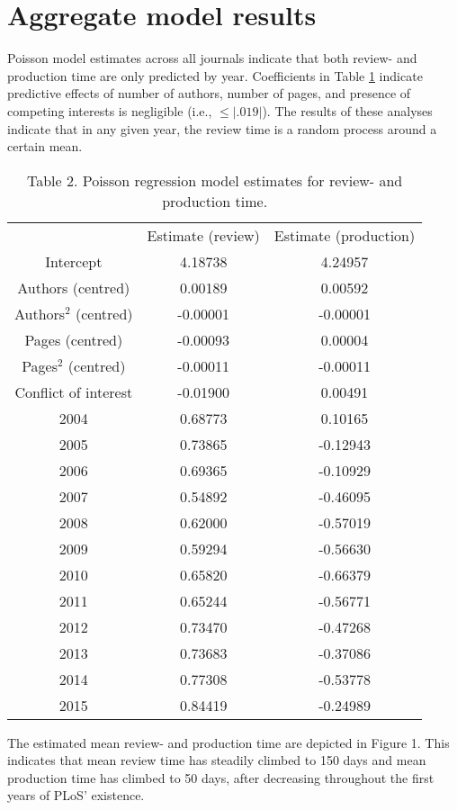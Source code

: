 \section*{Aggregate model results}
Poisson model estimates across all journals indicate that both review- and production time are only predicted by year. Coefficients in Table \ref{tab:tab2} indicate predictive effects of number of authors, number of pages, and presence of competing interests is negligible (i.e., $\leq |.019|$). The results of these analyses indicate that in any given year, the review time is a random process around a certain mean.

\begin{table}
\caption{Table 2. Poisson regression model estimates for review- and production time.}
\label{tab:tab2}
\begin{tabular}{ c c c }
    & Estimate (review) & Estimate (production) \\
    Intercept & 4.18738 & 4.24957 \\
    Authors (centred) & 0.00189 & 0.00592 \\
    Authors$^2$ (centred) & -0.00001 & -0.00001 \\
    Pages (centred) & -0.00093 & 0.00004 \\
    Pages$^2$ (centred) & -0.00011 & -0.00011 \\
    Conflict of interest & -0.01900 & 0.00491 \\
    2004  & 0.68773 & 0.10165 \\
    2005  & 0.73865 & -0.12943 \\
    2006  & 0.69365 & -0.10929 \\
    2007  & 0.54892 & -0.46095 \\
    2008  & 0.62000 & -0.57019 \\
    2009  & 0.59294 & -0.56630 \\
    2010  & 0.65820 & -0.66379 \\
    2011  & 0.65244 & -0.56771 \\
    2012  & 0.73470 & -0.47268 \\
    2013  & 0.73683 & -0.37086 \\
    2014  & 0.77308 & -0.53778 \\
    2015  & 0.84419 & -0.24989 \\
\end{tabular}
\end{table}

The estimated mean review- and production time are depicted in Figure 1. This indicates that mean review time has steadily climbed to 150 days and mean production time has climbed to 50 days, after decreasing throughout the first years of PLoS' existence.